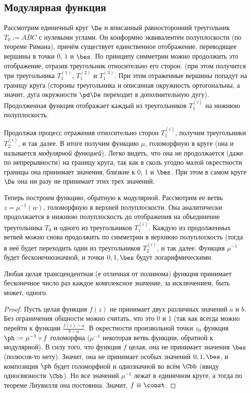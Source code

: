 \documentclass[a4paper]{article}
\begin{document}
\begin{theorem}
\subsection{Модулярная функция}

Рассмотрим единичный круг $\De$ и вписанный равносторонний треугольник $T_0 := ABC$ с нулевыми углами. Он конформно
эквивалентен полуплоскости (по теореме Римана), причём существует единственное отображение,  переводящее вершины
в точки $0$, $1$ и $\bes$. По принципу симметрии можно продолжить это отображение, отразив треугольник относительно
его сторон. (при этом получится три треугольника $T_1^{(1)}$, $T_1^{(2)}$ и $T_1^{(3)}$.
При этом отраженные вершины попадут на границу круга (стороны треугольника и описанная окружность ортогональны,
а значит, дуга окружности $\pd \De$ переходит в дополнительную дугу). Продолженная функция отображает каждый из
треугольников $T_1^{(i)}$ на нижнюю полуплоскость.

Продолжая процесс отражения относительно сторон $T_1^{(i)}$, получим треугольники $T_2^{(i)}$, и так далее.
В итоге получим функцию $\mu$, голоморфную в круге (она и называется \emph{модулярной функцией}). Легко видеть, что
она не продолжается (даже по непрерывности) на границу круга, так как в сколь угодно малой окрестности границы она
принимает значения, близкие к $0$, $1$ и $\bes$. При этом в самом круге $\De$ она ни разу не принимает этих трех значений.

Теперь построим  функцию, обратную к модулярной. Рассмотрим ее ветвь $z = \mu^{-1}(w)$, голоморфную в верхней полуплоскости.
Она аналитически продолжается в нижнюю полуплоскость до отображения на объединение треугольника $T_0$ и одного из
треугольников $T_1^{(i)}$. Каждую из продолженных ветвей можно снова продолжить по симметрии в верхнюю полуплоскость
(тогда в неё будет переходить один из треугольников $T_2^{(i)}$, и так далее. Функция $\mu^{-1}$ будет бесконечнозначной,
и точки $0,1,\bes$ будут логарифмическими.

\begin{theorem}
Любая целая трансцендентная (е отличная от полинома) функция принимает бесконечное число раз каждое
комплексное значение, за исключением, быть может, одного.
\end{theorem}
\begin{proof}
Пусть целая функция $f(z)$ не принимает двух различных значений $a$ и $b$. Без ограничения общности можно считать, что это $0$ и $1$
(так как всегда можно перейти к функции $\frac{f(z)-a}{b-a}$. В окрестности произвольной точки $z_0$ функция $\ph := \mu^{-1}\circ f$
голоморфна ($\mu^{-1}$ некоторая ветвь функции, обратной к модулярной). В силу того, что функция $f$ целая, она  не принимает
значения $\bes$ (полюсов-то нету). Значит, она не принимает особых значений $0,1,\bes$, и композиция $\ph$ будет
голоморфной и однозначной во всём $\Cbb$ (ввиду односвязности $\Cbb$). Но все значений $\mu^{-1}$ лежат в единичном круге,
а тогда по теореме Лиувилля она постоянна. Значит, $f\equiv\const$.
\end{proof}


\end{theorem}
\end{document}
